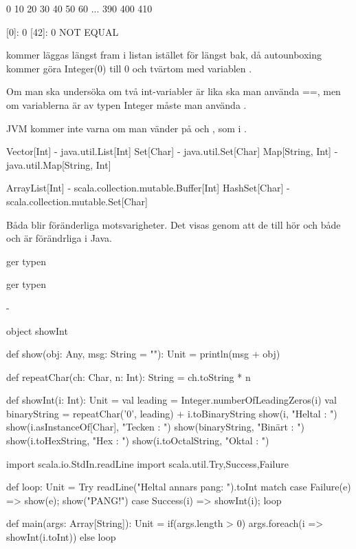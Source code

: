 \Subtask
\begin{REPLnonum}
0 10 20 30 40 50 60 ... 390 400 410

[0]: 0
[42]: 0
NOT EQUAL
\end{REPLnonum}

\Subtask  {}

 kommer läggas längst fram i listan istället för längst bak, då autounboxing kommer göra Integer(0) till 0 och tvärtom med variablen .

\Subtask  Om man ska undersöka om två int-variabler är lika ska man använda ==, men om variablerna är av typen Integer måste man använda .

JVM kommer inte varna om man vänder på  och , som i .


\Task     %

\Subtask  Vector[Int] - java.util.List[Int]
Set[Char] - java.util.Set[Char]
Map[String, Int] - java.util.Map[String, Int]

\Subtask  ArrayList[Int] - scala.collection.mutable.Buffer[Int]
HashSet[Char] - scala.collection.mutable.Set[Char]

Båda blir föränderliga motsvarigheter. Det visas genom att de till hör  och både  och  är förändrliga i Java.

\Subtask  {}

\Subtask  {} ger typen 

 ger typen 

\Subtask  -

\ExtraTasks %

\Task

\begin{Code}[numbers=left]
object showInt {
  def show(obj: Any, msg: String = ""): Unit = println(msg + obj)

  def repeatChar(ch: Char, n: Int): String = ch.toString * n

  def showInt(i: Int): Unit = {
    val leading = Integer.numberOfLeadingZeros(i)
    val binaryString = repeatChar('0', leading) + i.toBinaryString
    show(i,               "Heltal : ")
    show(i.asInstanceOf[Char],         "Tecken : ")
    show(binaryString,    "Binärt : ")
    show(i.toHexString,   "Hex    : ")
    show(i.toOctalString, "Oktal  : ")
  }


  import scala.io.StdIn.readLine
  import scala.util.{Try,Success,Failure}

  def loop: Unit =
    Try { readLine("Heltal annars pang: ").toInt } match {
      case Failure(e) => show(e); show("PANG!")
      case Success(i) => showInt(i); loop
    }

  def main(args: Array[String]): Unit =
    if(args.length > 0) args.foreach(i => showInt(i.toInt))
    else loop
}
\end{Code}


